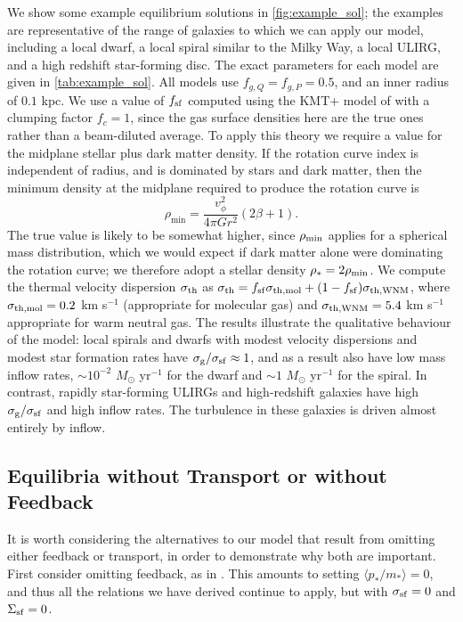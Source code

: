 \documentclass[useAMS,usenatbib]{mn2e}
\begin{document}
We show some example equilibrium solutions in \autoref{fig:example_sol}; the examples are representative of the range of galaxies to which we can apply our model, including a local dwarf, a local spiral similar to the Milky Way, a local ULIRG, and a high redshift star-forming disc. The exact parameters for each model are given in \autoref{tab:example_sol}. All models use $f_{g,Q} = f_{g,P} = 0.5$, and an inner radius of $0.1$ kpc. We use a value of $f_{\rm sf}$ computed using the KMT+ model of \citet{krumholz13c} with a clumping factor $f_c = 1$, since the gas surface densities here are the true ones rather than a beam-diluted average. To apply this theory we require a value for the midplane stellar plus dark matter density. If the rotation curve index is independent of radius, and is dominated by stars and dark matter, then the minimum density at the midplane required to produce the rotation curve is
\begin{equation}
\label{eq:rho_min}
\rho_{\mathrm{min}} = \frac{v_\phi^2}{4\pi G r^2} \left(2\beta+1\right).
\end{equation}
The true value is likely to be somewhat higher, since $\rho_{\rm min}$ applies for a spherical mass distribution, which we would expect if dark matter alone were dominating the rotation curve; we therefore adopt a stellar density $\rho_{\rm *} = 2 \rho_{\rm min}$. We compute the thermal velocity dispersion $\sigma_{\rm th}$ as $\sigma_{\rm th} = f_{\rm sf} \sigma_{\rm th,mol} + (1-f_{\rm sf})\sigma_{\rm th, WNM}$, where $\sigma_{\rm th,mol} = 0.2$ km s$^{-1}$ (appropriate for molecular gas) and $\sigma_{\rm th,WNM} = 5.4$ km s$^{-1}$ appropriate for warm neutral gas. The results illustrate the qualitative behaviour of the model: local spirals and dwarfs with modest velocity dispersions and modest star formation rates have $\sigma_{\rm g}/\sigma_{\rm sf} \approx 1$, and as a result also have low mass inflow rates, $\sim 10^{-2}$ $M_\odot$ yr$^{-1}$ for the dwarf and $\sim 1$ $M_\odot$ yr$^{-1}$ for the spiral. In contrast, rapidly star-forming ULIRGs and high-redshift galaxies have high $\sigma_{\rm g}/\sigma_{\rm sf}$ and high inflow rates. The turbulence in these galaxies is driven almost entirely by inflow.


\subsection{Equilibria without Transport or without Feedback}

It is worth considering the alternatives to our model that result from omitting either feedback or transport, in order to demonstrate why both are important. First consider omitting feedback, as in \citet{krumholz10c}. This amounts to setting $\langle p_*/m_*\rangle = 0$, and thus all the relations we have derived continue to apply, but with $\sigma_{\rm sf} = 0$ and $\Sigma_{\rm sf} = 0$. 
\end{document}
